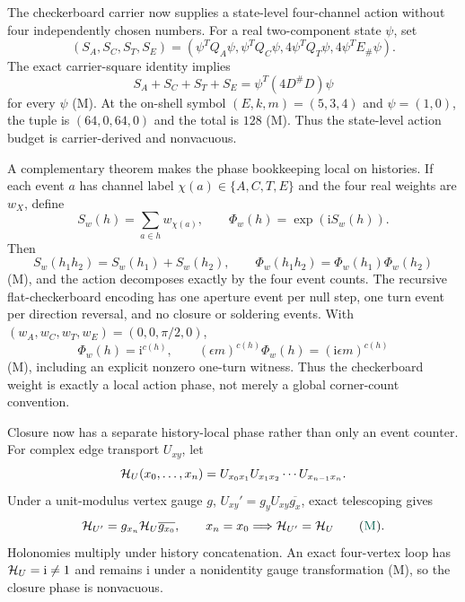 \documentclass[11pt]{article}
\newcommand{\Mtag}{\textcolor{verified}{\textsc{M}}}
\newcommand{\ii}{\mathrm{i}}
\begin{document}
The checkerboard carrier now supplies a state-level four-channel action without
four independently chosen numbers.  For a real two-component state $\psi$, set
\begin{equation}\label{eq:channelaction}
 (S_A,S_C,S_T,S_E)=
 (\psi^TQ_A\psi,\psi^TQ_C\psi,
  4\psi^TQ_T\psi,4\psi^TE_\#\psi).
\end{equation}
The exact carrier-square identity implies
\begin{equation}\label{eq:actionbudget}
 S_A+S_C+S_T+S_E
 =\psi^T(4D^\#D)\psi
\end{equation}
for every $\psi$ (\Mtag).  At the on-shell symbol
$(E,k,m)=(5,3,4)$ and $\psi=(1,0)$, the tuple is
$(64,0,64,0)$ and the total is $128$ (\Mtag).  Thus the state-level action
budget is carrier-derived and nonvacuous.

A complementary theorem makes the phase bookkeeping local on histories.  If
each event $a$ has channel label $\chi(a)\in\{A,C,T,E\}$ and the four real
weights are $w_X$, define
\begin{equation}\label{eq:historyaction}
  S_w(h)=\sum_{a\in h}w_{\chi(a)},
  \qquad \Phi_w(h)=\exp(\ii S_w(h)).
\end{equation}
Then
\begin{equation}\label{eq:historycompose}
  S_w(h_1h_2)=S_w(h_1)+S_w(h_2),\qquad
  \Phi_w(h_1h_2)=\Phi_w(h_1)\Phi_w(h_2)
\end{equation}
(\Mtag), and the action decomposes exactly by the four event counts.  The
recursive flat-checkerboard encoding has one aperture event per null step,
one turn event per direction reversal, and no closure or soldering events.
With $(w_A,w_C,w_T,w_E)=(0,0,\pi/2,0)$,
\begin{equation}\label{eq:localcornerphase}
  \Phi_w(h)=\ii^{c(h)},\qquad
  (\epsilon m)^{c(h)}\Phi_w(h)=(\ii\epsilon m)^{c(h)}
\end{equation}
(\Mtag), including an explicit nonzero one-turn witness.  Thus the
checkerboard weight is exactly a local action phase, not merely a global
corner-count convention.

Closure now has a separate history-local phase rather than only an event
counter.  For complex edge transport $U_{xy}$, let
\begin{equation}\label{eq:closureholonomy}
  {\cal H}_U(x_0,\ldots,x_n)=
    U_{x_0x_1}U_{x_1x_2}\cdots U_{x_{n-1}x_n}.
\end{equation}
Under a unit-modulus vertex gauge $g$,
$U_{xy}'=g_yU_{xy}\overline{g_x}$, exact telescoping gives
\begin{equation}\label{eq:closuregauge}
  {\cal H}_{U'}=g_{x_n}{\cal H}_U\overline{g_{x_0}},
  \qquad x_n=x_0\Longrightarrow {\cal H}_{U'}={\cal H}_U
  \qquad(\Mtag).
\end{equation}
Holonomies multiply under history concatenation.  An exact four-vertex loop
has ${\cal H}_U=\ii\ne1$ and remains $\ii$ under a nonidentity gauge
transformation (\Mtag), so the closure phase is nonvacuous.
\end{document}
